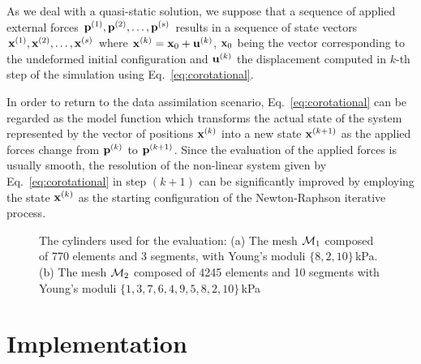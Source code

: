 As we deal with a quasi-static solution, we suppose that 
a sequence of applied external forces $\mathbf{p}^{(1)}, \mathbf{p}^{(2)}, \ldots, \mathbf{p}^{(s)}$ results in a sequence of state vectors
$\mathbf{x}^{(1)}, \mathbf{x}^{(2)}, \ldots, \mathbf{x}^{(s)}$ where $\mathbf{x}^{(k)} = \mathbf{x}_0 + \mathbf{u}^{(k)}$, $\mathbf{x}_0$ being the vector corresponding to the undeformed initial 
configuration and $\mathbf{u}^{(k)}$ the displacement computed in $k$-th step of the simulation using Eq.~\ref{eq:corotational}. 

In order to return to the data assimilation scenario, Eq.~\ref{eq:corotational} can be regarded as the model function which transforms 
the actual state of the system represented by the vector of positions $\mathbf{x}^{(k)}$ into a new state $\mathbf{x}^{(k+1)}$ as the applied forces
change from $\mathbf{p}^{(k)}$ to $\mathbf{p}^{(k+1)}$. Since the evaluation of the applied forces is usually smooth, 
the resolution of the non-linear system given by Eq.~\ref{eq:corotational} in step $(k+1)$ can be significantly 
improved by employing the state $\mathbf{x}^{(k)}$ as the starting configuration of the Newton-Raphson iterative process. 

\begin{figure}[th]%
\centering%
\hfill
{}
\caption{The cylinders used for the evaluation: (a) The mesh $\mathcal{M}_1$ composed of 770 elements and 3 segments, with Young's moduli $\{8,2,10\}$\,kPa.
(b) The mesh $\mathcal{M}_2$ composed of 4245 elements and 10 segments with Young's moduli $\{1,3,7,6,4,9,5,8,2,10\}$\,kPa}%
\label{f:cylScreens}
\end{figure}

\section{Implementation}
\label{s:implement}

